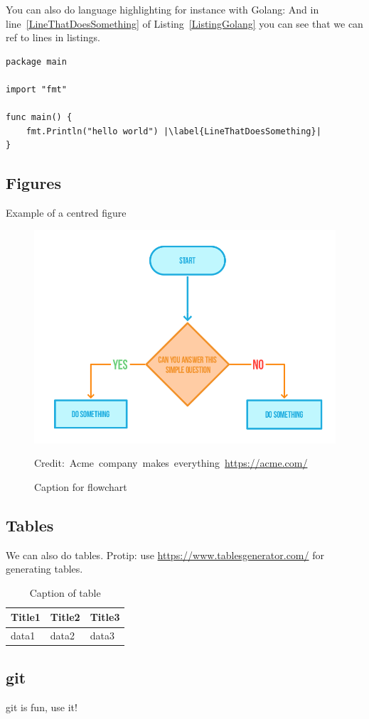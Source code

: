 You can also do language highlighting for instance with Golang:
And in line~\ref{LineThatDoesSomething} of Listing~\ref{ListingGolang} you can see that we can ref to lines in listings.

\begin{lstlisting}[caption={Hello world in Golang},label=ListingGolang,escapechar=|]
package main

import "fmt"

func main() {
    fmt.Println("hello world") |\label{LineThatDoesSomething}|
}

\end{lstlisting}

\subsection{Figures}

Example of a centred figure
\begin{figure}[H]
    \centering
    \includegraphics[scale=0.5]{figures/Flowchart}
    \caption{Caption for flowchart}
  	\medskip 
	\hspace*{15pt}\hbox{\scriptsize Credit: Acme company makes everything \url{https://acme.com/}}
    \label{FlowchartFigure}
\end{figure}

\subsection{Tables}

We can also do tables. Protip: use \url{https://www.tablesgenerator.com/} for generating tables.
\begin{table}[H]
\centering
\caption{Caption of table}
\label{TableLabel}
\begin{tabular}{|l|l|l|}
\hline
Title1 & Title2 & Title3 \\ \hline
data1  & data2  & data3  \\ \hline
\end{tabular}
\end{table}

\subsection{\gls{git}}

\gls{git} is fun, use it!
